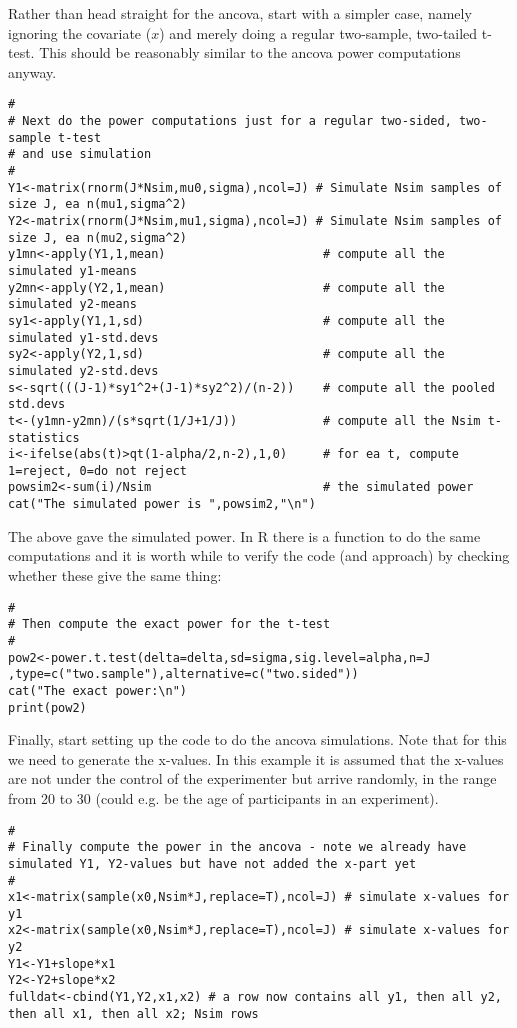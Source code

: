 \documentclass[12pt,a4paper]{article}
\theoremstyle{regla}
\theoremstyle{remark}
\theoremstyle{definition}
\theoremstyle{nonumberbreak}
\begin{document}
\begin{xmpl}
Rather than head straight for the ancova, start with a simpler case, namely ignoring the covariate ($x$) and merely doing a regular two-sample, two-tailed t-test.  This should be reasonably similar to the ancova power computations anyway.

\begin{lstlisting}
#
# Next do the power computations just for a regular two-sided, two-sample t-test
# and use simulation
#
Y1<-matrix(rnorm(J*Nsim,mu0,sigma),ncol=J) # Simulate Nsim samples of size J, ea n(mu1,sigma^2)
Y2<-matrix(rnorm(J*Nsim,mu1,sigma),ncol=J) # Simulate Nsim samples of size J, ea n(mu2,sigma^2)
y1mn<-apply(Y1,1,mean)                      # compute all the simulated y1-means
y2mn<-apply(Y2,1,mean)                      # compute all the simulated y2-means
sy1<-apply(Y1,1,sd)                         # compute all the simulated y1-std.devs
sy2<-apply(Y2,1,sd)                         # compute all the simulated y2-std.devs
s<-sqrt(((J-1)*sy1^2+(J-1)*sy2^2)/(n-2))    # compute all the pooled std.devs
t<-(y1mn-y2mn)/(s*sqrt(1/J+1/J))            # compute all the Nsim t-statistics
i<-ifelse(abs(t)>qt(1-alpha/2,n-2),1,0)     # for ea t, compute 1=reject, 0=do not reject
powsim2<-sum(i)/Nsim                        # the simulated power
cat("The simulated power is ",powsim2,"\n")
\end{lstlisting}

The above gave the simulated power.  In R there is a function to do the same computations and it is worth while to verify the code (and approach) by checking whether these give the same thing:

\begin{lstlisting}
#
# Then compute the exact power for the t-test
#
pow2<-power.t.test(delta=delta,sd=sigma,sig.level=alpha,n=J ,type=c("two.sample"),alternative=c("two.sided"))
cat("The exact power:\n")
print(pow2)
\end{lstlisting}

Finally, start setting up the code to do the ancova simulations.  Note that for this we need to generate the x-values.  In this example it is assumed that the x-values are not under the control of the experimenter but arrive randomly, in the range from 20 to 30 (could e.g. be the age of participants in an experiment).

\begin{lstlisting}
#
# Finally compute the power in the ancova - note we already have simulated Y1, Y2-values but have not added the x-part yet
#
x1<-matrix(sample(x0,Nsim*J,replace=T),ncol=J) # simulate x-values for y1
x2<-matrix(sample(x0,Nsim*J,replace=T),ncol=J) # simulate x-values for y2
Y1<-Y1+slope*x1
Y2<-Y2+slope*x2
fulldat<-cbind(Y1,Y2,x1,x2) # a row now contains all y1, then all y2, then all x1, then all x2; Nsim rows
\end{lstlisting}


\end{xmpl}
\end{document}
